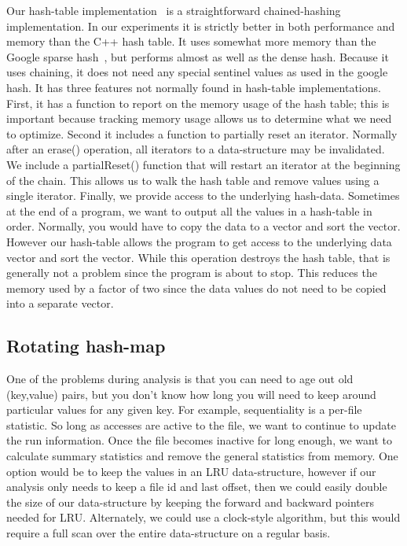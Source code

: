 Our hash-table implementation~\cite{DSOpenSource} is a straightforward
chained-hashing implementation.  In our experiments it is strictly
better in both performance and memory than the C++ hash table.  It
uses somewhat more memory than the Google sparse
hash~\cite{google-sparse-hash}, but performs almost as well as the
dense hash.  Because it uses chaining, it does not need any special
sentinel values as used in the google hash.  
It has three features not normally found in hash-table
implementations.  First, it has a function to report on the memory
usage of the hash table; this is important because tracking memory
usage allows us to determine what we need to optimize.  Second it
includes a function to partially reset an iterator.  Normally after an
erase() operation, all iterators to a data-structure may be
invalidated.  We include a partialReset() function that will restart
an iterator at the beginning of the chain.  This allows us to walk the
hash table and remove values using a single iterator.  Finally, we
provide access to the underlying hash-data.  Sometimes at the end of a
program, we want to output all the values in a hash-table in order.
Normally, you would have to copy the data to a vector and sort the
vector.  However our hash-table allows the program to get access to
the underlying data vector and sort the vector.  While this operation
destroys the hash table, that is generally not a problem since the
program is about to stop.  This reduces the memory used by a factor of
two since the data values do not need to be copied into a separate
vector.

\subsection{Rotating hash-map}

One of the problems during analysis is that you can need to age out
old (key,value) pairs, but you don't know how long you will need to
keep around particular values for any given key.  For example,
sequentiality is a per-file statistic.  So long as accesses are active
to the file, we want to continue to update the run information.  Once
the file becomes inactive for long enough, we want to calculate
summary statistics and remove the general statistics from memory.  One
option would be to keep the values in an LRU data-structure, however if
our analysis only needs to keep a file id and last offset, then we
could easily double the size of our data-structure by keeping the
forward and backward pointers needed for LRU.  Alternately, we could
use a clock-style algorithm, but this would require a full scan over
the entire data-structure on a regular basis.

